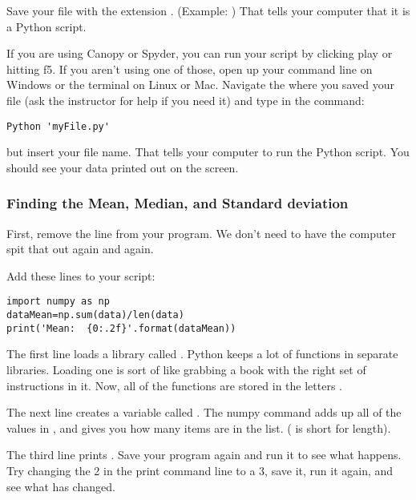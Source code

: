 \documentclass[twoside,11pt,ShortChapTitles]{BYUTextbook}
\begin{document}
Save your file with the extension . (Example: )  That tells your computer that it is a Python script.

If you are using Canopy or Spyder, you can run your script by clicking play or hitting f5.  If you aren't using one of those, open up your command line on Windows or the terminal on Linux or Mac.  Navigate the where you saved your file (ask the instructor for help if you need it) and type in the command:
\begin{Verbatim}
Python 'myFile.py'

\end{Verbatim}
but insert your file name. That tells your computer to run the Python script.  You should see your data printed out on the screen.

\subsubsection{Finding the Mean, Median, and Standard deviation}

First, remove the  line from your program. We don't need to have the computer spit that out again and again.

Add these lines to your script:
\begin{Verbatim}
import numpy as np
dataMean=np.sum(data)/len(data)
print('Mean:  {0:.2f}'.format(dataMean))

\end{Verbatim}

The first line loads a library called .  Python keeps a lot of functions in separate libraries.  Loading one is sort of like grabbing a book with the right set of instructions in it.  Now, all of the  functions are stored in the letters .

The next line creates a variable called . The numpy  command adds up all of the values in , and  gives you how many items are in the  list. ( is short for length).

The third line prints .  Save your program again and run it to see what happens.  Try changing the 2 in the print command line to a 3, save it, run it again, and see what has changed.
\end{document}

